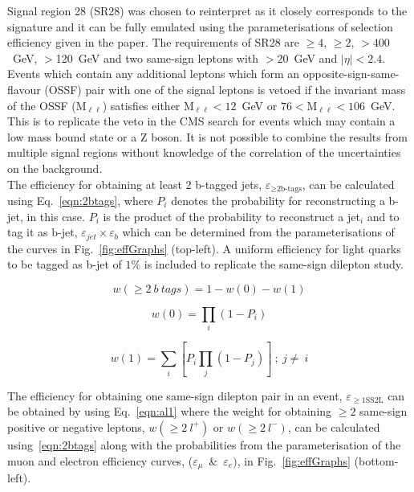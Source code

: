 Signal region 28 (SR28) was chosen to reinterpret as it closely corresponds to the \tttt signature and it can be fully emulated using the parameterisations of selection efficiency given in the paper. 
The requirements of SR28 are \njets$\geq4$, \nbtags$\geq2$, \HT$>400$~GeV, \MET$>$120~GeV and two same-sign leptons with \pt$>20$~GeV and $|\eta|<2.4$. Events which contain any additional leptons which form an opposite-sign-same-flavour (OSSF) pair with one of the signal leptons is vetoed if the invariant mass of the OSSF (M$_{\ell\ell}$) satisfies either M$_{\ell\ell}<12$~GeV or $76<$M$_{\ell\ell}<106$~GeV. This is to replicate the veto in the CMS search for events which may contain a low mass bound state or a Z boson.
It is not possible to combine the results from multiple signal regions without knowledge of the correlation of the uncertainties on the background. \\
The efficiency for obtaining at least 2 b-tagged jets, $\varepsilon_{\geq\text{2b-tags}}$, can be calculated using Eq.~\ref{eqn:2btags}, where $P_{i}$ denotes the probability for reconstructing a b-jet, in this case. $P_{i}$ is the product of the probability to reconstruct a jet$_{i}$ and to tag it as b-jet, $\varepsilon_{jet} \times \varepsilon_{b}$ which can be determined from the parameterisations of the curves in Fig.~\ref{fig:effGraphs} (top-left). A uniform efficiency for light quarks to be tagged as b-jet of $1\%$ is included to replicate the same-sign dilepton study.


\begin{equation}
w(\geq2~b~tags) = 1 - w(0) - w(1)
\label{eqn:2btags}
\end{equation}

\begin{equation}
w(0) = \prod_{i} ( 1 - P_{i})
\label{eqn:0btags}
\end{equation}


\begin{equation}
w(1) = \sum_{i}\left[P_{i}\prod_{j} ( 1 - P_{j})\right]~;~j\neq~i
\label{eqn:1btags}
\end{equation}

The efficiency for obtaining one same-sign dilepton pair in an event, $\varepsilon_{\geq1 \text{SS2L}}$ can be obtained by using Eq.~\ref{eqn:al1} where the weight for obtaining $\geq2$ same-sign positive or negative leptons, $ w(\geq2~l^{+})$ or  $ w(\geq2~l^{-})$, can be calculated using~\ref{eqn:2btags} along with the probabilities from the parameterisation of the muon and electron efficiency curves, ($\varepsilon_{\mu}$~\&~$\varepsilon_{e})$, in Fig.~\ref{fig:effGraphs} (bottom-left).

